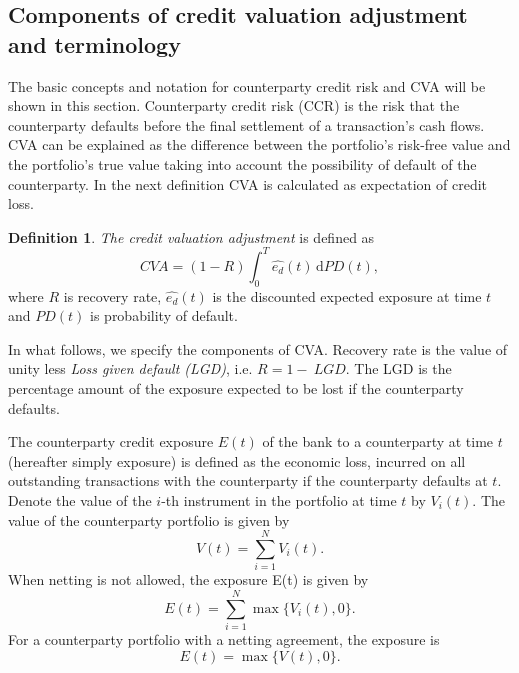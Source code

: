 \documentclass{amsart}
\theoremstyle{definition}\newtheorem{definition}[theorem]{Definition}
\theoremstyle{remark}\newtheorem{remark}[theorem]{Remark}
\newcommand{\dif}{\,\mathrm{d}}
\begin{document}
\subsection{Components of credit valuation adjustment and terminology}
The basic concepts and notation for counterparty credit risk and CVA will be shown in this section.
Counterparty credit risk (CCR) is the risk that the counterparty defaults before the final settlement of a transaction's cash flows.
CVA can be explained as the difference between the portfolio's risk-free value and the portfolio's true value taking into account the possibility of default of the counterparty.
In the next definition CVA is calculated as expectation of credit loss.
\begin{definition}
 \textit{The credit valuation adjustment} is defined as
 \begin{equation}
 CVA=(1-R)\int_{0}^T \hat{e_d}(t)\dif PD(t),
 \label{CVA}
\end{equation}
  where $R$ is recovery rate, $\hat{e_d}(t)$ is the discounted expected exposure at time $t$ and $PD(t)$ is probability of default.
\end{definition}
In what follows, we specify the components of CVA. 
Recovery rate is the value of unity less \textit{Loss given default (LGD)}, i.e. $R=1-~LGD$.
The LGD is the percentage amount of the exposure expected to be lost if the counterparty defaults.

The counterparty credit exposure $E(t)$ of the bank to a counterparty at time $t$ (hereafter simply exposure) is defined as the economic loss, incurred on all outstanding transactions with the counterparty if the counterparty defaults at $t$.
Denote the value of the $i$-th instrument in the portfolio at time $t$ by  $V_i(t)$. 
The value of the counterparty portfolio is given by 
\begin{equation}
V(t)=\sum_{i=1}^N V_i(t).
\end{equation}
When netting is not allowed, the exposure E(t) is given by
\begin{equation}
E(t)=\sum_{i=1}^N\max\{V_i(t),0\}.
\end{equation}
For a counterparty portfolio with a netting agreement, the exposure is
\begin{equation}
E(t)=\max\{V(t),0\}.
\label{totalExposure}
\end{equation}
\end{document}
